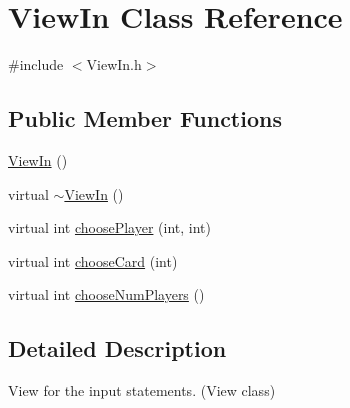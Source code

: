 \hypertarget{class_view_in}{\section{View\-In Class Reference}
\label{class_view_in}
}


{\ttfamily \#include $<$View\-In.\-h$>$}

\subsection*{Public Member Functions}
\begin{DoxyCompactItemize}
\item 
\hyperlink{class_view_in_ad24777c474d271b2758106d9ed4b3515}{View\-In} ()
\item 
virtual \hyperlink{class_view_in_a5c50b11c7c5a7e43f8d49057b77c1961}{$\sim$\-View\-In} ()
\item 
virtual int \hyperlink{class_view_in_a9b8ec8154354503af00665960d0b7d20}{choose\-Player} (int, int)
\item 
virtual int \hyperlink{class_view_in_ad93dc72d6ac780efa910d0fc0901437c}{choose\-Card} (int)
\item 
virtual int \hyperlink{class_view_in_aa340992dbc465c9c245ce6900aa9a37f}{choose\-Num\-Players} ()
\end{DoxyCompactItemize}


\subsection{Detailed Description}
View for the input statements. (View class) 

